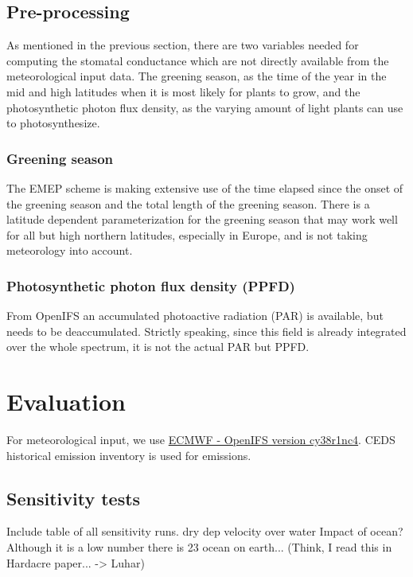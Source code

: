 \documentclass[gmd, manuscript]{copernicus}
\begin{document}
\subsection{Pre-processing}
\label{subsec:pre-pro}
As mentioned in the previous section, there are two variables needed for computing the stomatal conductance which are not directly available from the meteorological input data. The greening season, as the time of the year in the mid and high latitudes when it is most likely for plants to grow, and the photosynthetic photon flux density, as the varying amount of light plants can use to photosynthesize.
\subsubsection{Greening season}
\label{subsubsec:greening}
The EMEP scheme is making extensive use of the time elapsed since the onset of the greening season and the total length of the greening season. There is a latitude dependent parameterization for the greening season that may work well for all but high northern latitudes, especially in Europe, and is not taking meteorology into account.  
\subsubsection{Photosynthetic photon flux density (PPFD)}
From OpenIFS an accumulated photoactive radiation (PAR) is available, but needs to be deaccumulated. Strictly speaking, since this field is already integrated over the whole spectrum, it is not the actual PAR but PPFD. 
\section{Evaluation}
\label{sec:eval}
For meteorological input, we use \href{https://www.ecmwf.int/en/forecasts/documentation-and-support/evolution-ifs/cycle-38r1-summary-changes}{ECMWF - OpenIFS version cy38r1nc4}. CEDS historical emission inventory is used for emissions.
\subsection{Sensitivity tests}
\label{subsec:sens}
Include table of all sensitivity runs.
\citep[e.g., $v^\chem{O_3}_{ice/snow} = 1/10000\,\unit{cm s^{-1}}$,][]{ACP:Helmig2007}
dry dep velocity over water \citep{JGR:Helmig2012} Impact of ocean? Although it is a low number there is 2\/3 ocean on earth... (Think, I read this in Hardacre paper... -> Luhar)
\end{document}
